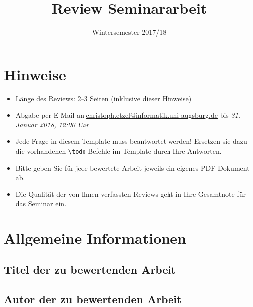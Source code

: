 \documentclass[a4paper,DIV=16]{scrartcl}
\begin{document}
\title{Review Seminararbeit}
\date{Wintersemester 2017/18}

\subtitle{}

\author{}

\maketitle
\thispagestyle{empty}

\section*{Hinweise}
\begin{itemize}
\item Länge des Reviews: 2--3 Seiten (inklusive dieser Hinweise)
\item Abgabe per E-Mail an \url{christoph.etzel@informatik.uni-augsburg.de} bis \emph{31. Januar 2018, 12:00 Uhr}
\item Jede Frage in diesem Template muss beantwortet werden! Ersetzen sie dazu die vorhandenen \texttt{\textbackslash{}todo}-Befehle im Template durch Ihre Antworten.
\item Bitte geben Sie für jede bewertete Arbeit jeweils ein eigenes PDF-Dokument ab.
\item Die Qualität der von Ihnen verfassten Reviews geht in Ihre Gesamtnote für das Seminar ein.
\end{itemize}

\section*{Allgemeine Informationen}
\subsection*{Titel der zu bewertenden Arbeit}


\subsection*{Autor der zu bewertenden Arbeit}
\end{document}
